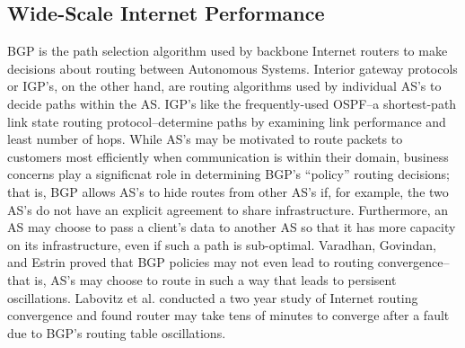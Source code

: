 \documentclass[pageno]{jpaper}
\begin{document}
\subsection{Wide-Scale Internet Performance}
BGP is the path selection algorithm used by backbone Internet routers to make 
decisions about routing between Autonomous Systems.
Interior gateway protocols or IGP's, on the other hand, are routing algorithms used by individual
AS's to decide paths within the AS. IGP's like the frequently-used OSPF\cite{ospfrfc}--a shortest-path link
state routing protocol--determine paths by examining link performance and least
number of hops.  While AS's may be motivated to route packets to customers most 
efficiently when communication is within their domain, business concerns play a 
significnat role in determining BGP's ``policy'' routing decisions; that is, BGP
allows AS's to hide routes from other AS's if, for example, the two AS's do not have
an explicit agreement to share infrastructure.  Furthermore, an AS may choose to 
pass a client's data to another AS so that it has more capacity on its infrastructure,
even if such a path is sub-optimal.  Varadhan, Govindan, and Estrin proved that BGP
policies may not even lead to routing convergence--that is, AS's may choose to 
route in such a way that leads to persisent oscillations\cite{varadhan}.  Labovitz et al.\cite{labovitz}
conducted a two year study of Internet routing convergence and found router may take tens of minutes to converge after a fault due to BGP's routing table oscillations. 
\end{document}
